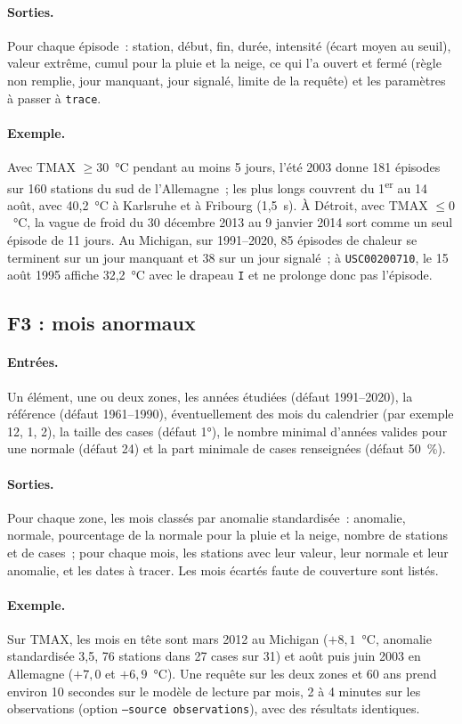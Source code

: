 \paragraph{Sorties.} Pour chaque épisode~: station, début, fin, durée, intensité (écart moyen au seuil), valeur extrême, cumul pour la pluie et la neige, ce qui l'a ouvert et fermé (règle non remplie, jour manquant, jour signalé, limite de la requête) et les paramètres à passer à \texttt{trace}.
\paragraph{Exemple.} Avec TMAX $\geq 30$~°C pendant au moins 5 jours, l'été 2003 donne 181 épisodes sur 160 stations du sud de l'Allemagne~; les plus longs couvrent du 1\textsuperscript{er} au 14 août, avec 40,2~°C à Karlsruhe et à Fribourg (1,5~s). À Détroit, avec TMAX $\leq 0$~°C, la vague de froid du 30 décembre 2013 au 9 janvier 2014 sort comme un seul épisode de 11 jours. Au Michigan, sur 1991--2020, 85 épisodes de chaleur se terminent sur un jour manquant et 38 sur un jour signalé~; à \texttt{USC00200710}, le 15 août 1995 affiche 32,2~°C avec le drapeau \texttt{I} et ne prolonge donc pas l'épisode.

\subsection{F3 : mois anormaux}
\paragraph{Entrées.} Un élément, une ou deux zones, les années étudiées (défaut 1991--2020), la référence (défaut 1961--1990), éventuellement des mois du calendrier (par exemple 12, 1, 2), la taille des cases (défaut 1°), le nombre minimal d'années valides pour une normale (défaut 24) et la part minimale de cases renseignées (défaut 50~\%).
\paragraph{Sorties.} Pour chaque zone, les mois classés par anomalie standardisée~: anomalie, normale, pourcentage de la normale pour la pluie et la neige, nombre de stations et de cases~; pour chaque mois, les stations avec leur valeur, leur normale et leur anomalie, et les dates à tracer. Les mois écartés faute de couverture sont listés.
\paragraph{Exemple.} Sur TMAX, les mois en tête sont mars 2012 au Michigan ($+8,1$~°C, anomalie standardisée 3,5, 76 stations dans 27 cases sur 31) et août puis juin 2003 en Allemagne ($+7,0$ et $+6,9$~°C). Une requête sur les deux zones et 60 ans prend environ 10 secondes sur le modèle de lecture par mois, 2 à 4 minutes sur les observations (option \texttt{--source observations}), avec des résultats identiques.

